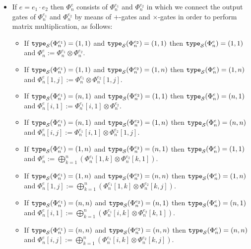 \begin{itemize}
%
%
\item 
If $e=e_1\cdot e_2$ then $\Phi_n^e$ consists of $\Phi_n^{e_1}$ and $\Phi_n^{e_2}$ in which we connect the output gates of $\Phi_n^{e_1}$ and $\Phi_n^{e_2}$
by means of $+$-gates and $\times$-gates in order to perform matrix multiplication, as follows:

\begin{itemize}
	\item If $\texttt{type}_{\mathcal{S}}(\Phi^{e_1}_n)=(1,1)$ and $\texttt{type}_{\mathcal{S}}(\Phi^{e_2}_n)=(1, 1)$ then $\texttt{type}_{\mathcal{S}}(\Phi^{e}_n)=(1, 1)$ and $\Phi^{e}_n:=\Phi^{e_1}_n \otimes \Phi^{e_2}_n$.
  \item If $\texttt{type}_{\mathcal{S}}(\Phi^{e_1}_n)=(1,1)$ and $\texttt{type}_{\mathcal{S}}(\Phi^{e_2}_n)=(1, n)$ then $\texttt{type}_{\mathcal{S}}(\Phi^{e}_n)=(1, n)$ and $\Phi^{e}_n[1,j]:=\Phi^{e_1}_n \otimes \Phi^{e_2}_n[1,j]$.
  \item If $\texttt{type}_{\mathcal{S}}(\Phi^{e_1}_n)=(n,1)$ and $\texttt{type}_{\mathcal{S}}(\Phi^{e_2}_n)=(1, 1)$ then $\texttt{type}_{\mathcal{S}}(\Phi^{e}_n)=(n, 1)$ and $\Phi^{e}_n[i,1]:=\Phi^{e_1}_n[i,1] \otimes \Phi^{e_2}_n$.
  \item If $\texttt{type}_{\mathcal{S}}(\Phi^{e_1}_n)=(n,1)$ and $\texttt{type}_{\mathcal{S}}(\Phi^{e_2}_n)=(1, n)$ then $\texttt{type}_{\mathcal{S}}(\Phi^{e}_n)=(n, n)$ and $\Phi^{e}_n[i,j]:=\Phi^{e_1}_n[i,1] \otimes \Phi^{e_2}_n[1,j]$.
  \item If $\texttt{type}_{\mathcal{S}}(\Phi^{e_1}_n)=(1,n)$ and $\texttt{type}_{\mathcal{S}}(\Phi^{e_2}_n)=(n, 1)$ then $\texttt{type}_{\mathcal{S}}(\Phi^{e}_n)=(1, 1)$ and $\Phi^{e}_n:=\bigoplus_{k=1}^n \left( \Phi^{e_1}_n[1,k] \otimes \Phi^{e_2}_n[k,1] \right)$.
  \item If $\texttt{type}_{\mathcal{S}}(\Phi^{e_1}_n)=(1,n)$ and $\texttt{type}_{\mathcal{S}}(\Phi^{e_2}_n)=(n, n)$ then $\texttt{type}_{\mathcal{S}}(\Phi^{e}_n)=(1, n)$ and $\Phi^{e}_n[1,j]:=\bigoplus_{k=1}^n \left( \Phi^{e_1}_n[1,k] \otimes \Phi^{e_2}_n[k,j] \right)$.
  \item If $\texttt{type}_{\mathcal{S}}(\Phi^{e_1}_n)=(n,n)$ and $\texttt{type}_{\mathcal{S}}(\Phi^{e_2}_n)=(n, 1)$ then $\texttt{type}_{\mathcal{S}}(\Phi^{e}_n)=(n, 1)$ and $\Phi^{e}_n[i,1]:=\bigoplus_{k=1}^n \left( \Phi^{e_1}_n[i,k] \otimes \Phi^{e_2}_n[k,1] \right)$.
  \item If $\texttt{type}_{\mathcal{S}}(\Phi^{e_1}_n)=(n,n)$ and $\texttt{type}_{\mathcal{S}}(\Phi^{e_2}_n)=(n, n)$ then $\texttt{type}_{\mathcal{S}}(\Phi^{e}_n)=(n, n)$ and $\Phi^{e}_n[i,j]:=\bigoplus_{k=1}^n \left( \Phi^{e_1}_n[i,k] \otimes \Phi^{e_2}_n[k,j] \right)$.

\end{itemize}
\end{itemize}
